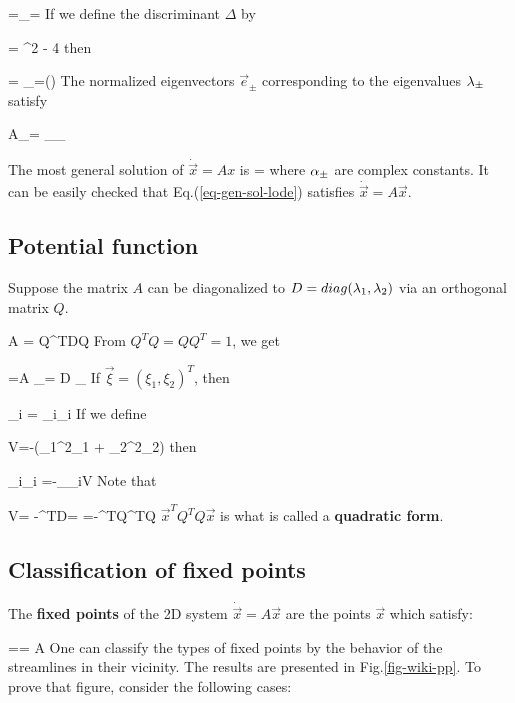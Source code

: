 \beq
\lam =\lam_{\pm}=
\eeq
If we define the discriminant $\Delta$ by

\beq
\Delta = \tau^2 - 4 \delta
\eeq
then

\beq
\lam = \lam_\pm =(\tau\pm \sqrt{\Delta})
\eeq
The normalized eigenvectors $\vec{e}_\pm$ corresponding
to the eigenvalues $\lambda_\pm$ satisfy

\beq 
A_\pm = \lam_{\pm}_\pm
\eeq


The most general solution 
of $\dot{\vec{x}}=A x$ is
\beq
{} = 
\Re{}
\label{eq-gen-sol-lode}
\eeq
where $\alpha_\pm$ are complex constants. It can be easily checked that
Eq.(\ref{eq-gen-sol-lode}) satisfies $\dot{\vec{x}} = A \vec{x}$.

\subsection{Potential function}

Suppose the matrix $A$ can be diagonalized to $D=diag(\lambda_1, \lambda_2)$
via an orthogonal matrix $Q$.

\beq
A = Q^TDQ
\eeq
From $Q^TQ=QQ^T=1$, we get

\beq
{}=A
\implies
{}_{\ddot{\vec{\xi}}}= D _{\vec{\xi}}
\eeq
If $\vec{\xi} = (\xi_1, \xi_2)^T$,
then

\beq
\ddot{\xi}_i = \lam_i\xi_i\quad {}
\eeq
If we define

\beq
V=-(\lam_1\xi^2_1 + \lam_2\xi^2_2)
\eeq
then

\beq
\lam_i\xi_i =-\partial_{\xi_i}V \quad {}
\eeq
Note that

\beq
V=
-\vec{\xi}^TD\vec{\xi}=
=-^TQ^TQ
\eeq
$\vec{x}^TQ^TQ\vec{x}$ is what is called a
{\bf quadratic form}.




\subsection{Classification of fixed points}

The {\bf fixed points} of the 2D system $\dot{\vec{x}}=A\vec{x}$ are 
the points $\vec{x}$ which satisfy:

== A
\eeq
One can classify the types of fixed points by the behavior
of the streamlines in their vicinity.
The results are 
presented in Fig.\ref{fig-wiki-pp}.
To prove that figure, consider the following cases:


